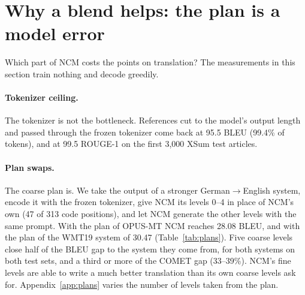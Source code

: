 \documentclass[11pt]{article}
\begin{document}
\section{Why a blend helps: the plan is a model error}
\label{sec:why}

Which part of NCM costs the points on translation? The measurements in this section train nothing and decode greedily.

\paragraph{Tokenizer ceiling.} The tokenizer is not the bottleneck. References cut to the model's output length and passed through the
frozen tokenizer come back at 95.5 BLEU (99.4\% of tokens), and at 99.5 ROUGE-1 on the first 3,000 XSum test articles.

\paragraph{Plan swaps.} The coarse plan is. We take the output of a stronger German$\to$English system, encode it with the frozen
tokenizer, give NCM its levels 0--4 in place of NCM's own (47 of 313 code positions), and let NCM generate the other
levels with the same prompt. With the plan of OPUS-MT \citep{tiedemann2020opusmt} NCM reaches 28.08 BLEU, and with the
plan of the WMT19 system of \citet{ng2019fair} 30.47 (Table~\ref{tab:plans}). Five coarse levels close half of the
BLEU gap to the system they come from, for both systems on both test sets, and a third or more of the COMET gap (33--39\%). NCM's fine
levels are able to write a much better translation than its own coarse levels ask for.
Appendix~\ref{app:plans} varies the number of levels taken from the plan.
\end{document}
